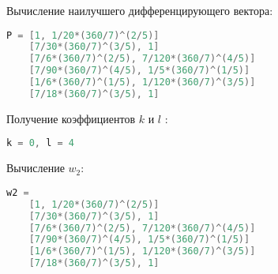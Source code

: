 \documentclass[specialist,
	substylefile = spbu_report.rtx,
	subf,href,colorlinks=true, 12pt]{disser}
\begin{document}
Вычисление наилучшего дифференцирующего вектора:
\begin{lstlisting}[language=c++,basicstyle=\footnotesize\ttfamily]
	P = [1, 1/20*(360/7)^(2/5)]
	[7/30*(360/7)^(3/5), 1]
	[7/6*(360/7)^(2/5), 7/120*(360/7)^(4/5)]
	[7/90*(360/7)^(4/5), 1/5*(360/7)^(1/5)]
	[1/6*(360/7)^(1/5), 1/120*(360/7)^(3/5)]
	[7/18*(360/7)^(3/5), 1]
\end{lstlisting}
Получение коэффициентов $k$ и $l$
:
\begin{lstlisting}[language=c++,basicstyle=\footnotesize\ttfamily]
	k = 0, l = 4
\end{lstlisting}
Вычисление $w_2$:
\begin{lstlisting}[language=c++,basicstyle=\footnotesize\ttfamily]
	w2 = 
	[1, 1/20*(360/7)^(2/5)]
	[7/30*(360/7)^(3/5), 1]
	[7/6*(360/7)^(2/5), 7/120*(360/7)^(4/5)]
	[7/90*(360/7)^(4/5), 1/5*(360/7)^(1/5)]
	[1/6*(360/7)^(1/5), 1/120*(360/7)^(3/5)]
	[7/18*(360/7)^(3/5), 1]
\end{lstlisting}
\end{document}
